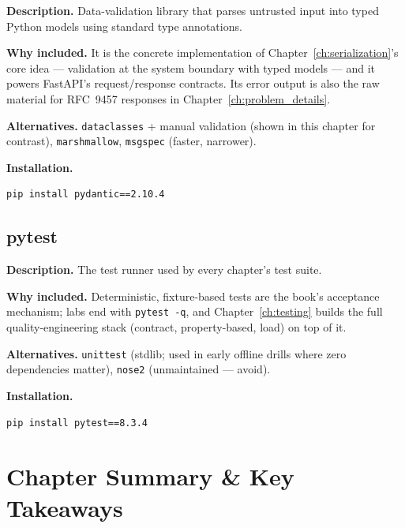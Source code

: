 \textbf{Description.} Data-validation library that parses untrusted input
into typed Python models using standard type annotations.

\textbf{Why included.} It is the concrete implementation of
Chapter~\ref{ch:serialization}'s core idea --- validation at the system
boundary with typed models --- and it powers FastAPI's request/response
contracts. Its error output is also the raw material for RFC~9457 responses
in Chapter~\ref{ch:problem_details}.

\textbf{Alternatives.} \texttt{dataclasses} + manual validation (shown in
this chapter for contrast), \texttt{marshmallow}, \texttt{msgspec}
(faster, narrower).

\textbf{Installation.}
\begin{verbatim}
pip install pydantic==2.10.4
\end{verbatim}

\subsection{pytest}

\textbf{Description.} The test runner used by every chapter's test suite.

\textbf{Why included.} Deterministic, fixture-based tests are the book's
acceptance mechanism; labs end with \texttt{pytest -q}, and
Chapter~\ref{ch:testing} builds the full quality-engineering stack
(contract, property-based, load) on top of it.

\textbf{Alternatives.} \texttt{unittest} (stdlib; used in early offline
drills where zero dependencies matter), \texttt{nose2} (unmaintained ---
avoid).

\textbf{Installation.}
\begin{verbatim}
pip install pytest==8.3.4
\end{verbatim}

\section{Chapter Summary \& Key Takeaways}
\label{sec:ch0-summary}

